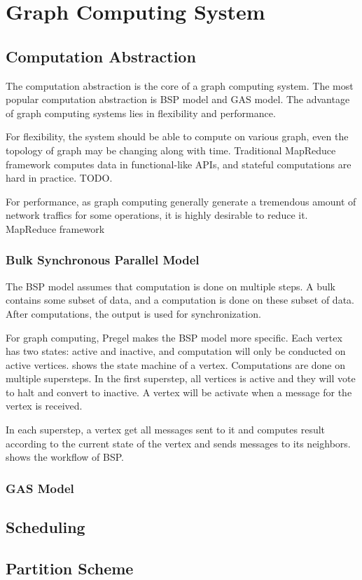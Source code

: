 \section{Graph Computing System}
\subsection{Computation Abstraction}
The computation abstraction is the core of a graph computing system. The
most popular computation abstraction is BSP model and GAS model.
The advantage of graph computing systems lies in flexibility and performance.

For flexibility, the system should be able to compute on various
graph, even the topology of graph may be changing along with time.
Traditional MapReduce framework computes data in functional-like
APIs, and stateful computations are hard in practice. TODO.

For performance, as graph computing generally generate a tremendous
amount of network traffics for some operations,
it is highly desirable to reduce it. MapReduce framework 


\subsubsection{Bulk Synchronous Parallel Model}
The BSP model assumes that computation is done on multiple steps. A bulk contains
some subset of data, and a computation is done on these subset of data. After
computations, the output is used for synchronization.

For graph computing, Pregel makes the BSP model more specific.
Each vertex has two states: active and inactive, and computation
will only be conducted on active vertices.  shows the
state machine of a vertex. Computations are done on multiple
supersteps. In the first superstep, all vertices is active and they
will vote to halt and convert to inactive. A vertex will be activate
when a message for the vertex is received.

In each superstep, a vertex get all messages sent to it and computes
result according to the current state of the vertex and sends messages
to its neighbors.  shows the workflow of BSP.




\subsubsection{GAS Model}


\subsection{Scheduling}
\subsection{Partition Scheme}
